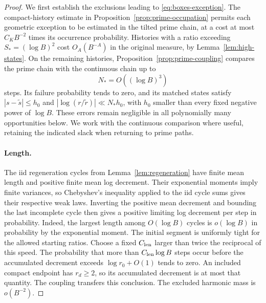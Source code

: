\begin{proof}
We first establish the exclusions leading to \eqref{eq:boxes-exception}.
The compact-history estimate in
Proposition~\ref{prop:prime-occupation} permits each geometric
exception to be estimated in the tilted prime chain, at a cost at
most $C_KB^{-2}$ times its occurrence probability.  Histories with
a ratio exceeding $S_*=(\log B)^2$ cost $O_A(B^{-A})$ in the
original measure, by Lemma~\ref{lem:high-states}.  On the remaining
histories, Proposition~\ref{prop:prime-coupling} compares the prime
chain with the continuous chain up to
\[
 N_*=O((\log B)^3)
\]
steps.  Its failure probability tends to zero, and its matched
states satisfy $|s-\widetilde s|\le h_0$ and
$|\log(r/\widetilde r)|\ll N_*h_0$, with $h_0$ smaller than every
fixed negative power of $\log B$.  These errors remain negligible
in all polynomially many opportunities below.  We work with the
continuous comparison where useful, retaining the indicated slack
when returning to prime paths.

\paragraph{Length.}
The iid regeneration cycles from Lemma~\ref{lem:regeneration} have
finite mean length and positive finite mean log decrement. Their
exponential moments imply finite variances, so Chebyshev's inequality
applied to the iid cycle sums gives their respective weak laws.
Inverting the positive mean decrement and bounding the last incomplete
cycle then gives a positive limiting log decrement per step in
probability. Indeed, the largest length among $O(\log B)$ cycles is
$o(\log B)$ in probability by the exponential moment. The initial
segment is uniformly tight for the allowed starting ratios.
Choose a fixed $C_{\rm len}$ larger than twice the reciprocal of
this speed.  The probability that more than $C_{\rm len}\log B$
steps occur before the accumulated decrement exceeds
$\log r_0+O(1)$ tends to zero.  An included compact endpoint has
$r_d\ge2$, so its accumulated decrement is at most that quantity.
The coupling transfers this conclusion.  The excluded harmonic
mass is $o(B^{-2})$.


\end{proof}

